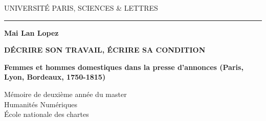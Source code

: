 \begin{titlepage}


\begin{center}

\bigskip

\begin{large}
UNIVERSITÉ PARIS, SCIENCES \& LETTRES
\end{large}

\begin{center}\rule{2cm}{0.02cm}\end{center}

\bigskip
\bigskip
\bigskip
\begin{Large}
\textbf{Mai Lan Lopez}\\
\end{Large}

\bigskip
\bigskip
\bigskip

\begin{Huge}
\textbf{DÉCRIRE SON TRAVAIL, ÉCRIRE SA CONDITION}\\
\end{Huge}

\bigskip
\bigskip
\begin{LARGE}
\textbf{Femmes et hommes domestiques dans la presse d'annonces (Paris, Lyon, Bordeaux, 1750-1815) }\\
\end{LARGE}

\bigskip
\bigskip
\bigskip
\vfill

\begin{large}
Mémoire de deuxième année du master\\
\og Humanités Numériques \fg{} \\
École nationale des chartes \\
\end{large}

\end{center}
\end{titlepage}